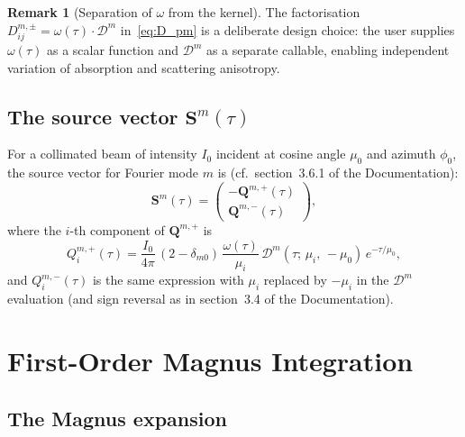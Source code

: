 \documentclass[11pt,a4paper]{article}
\newcommand{\vect}[1]{\bm{#1}}
\theoremstyle{definition}
\newtheorem{remark}{Remark}
\begin{document}
\begin{remark}[Separation of $\omega$ from the kernel]
The factorisation $D^{m,\pm}_{ij}=\omega(\tau)\cdot\mathcal{D}^m$
in~\eqref{eq:D_pm} is a deliberate design choice: the user supplies
$\omega(\tau)$ as a scalar function and $\mathcal{D}^m$ as a separate
callable, enabling independent variation of absorption and scattering
anisotropy.
\end{remark}

\subsection{The source vector \texorpdfstring{$\vect{S}^m(\tau)$}{S\_m(tau)}}

For a collimated beam of intensity $I_0$ incident at cosine angle
$\mu_0$ and azimuth $\phi_0$, the source vector for Fourier mode $m$
is (cf.\ section~3.6.1 of the Documentation):
\begin{equation}\label{eq:source}
  \vect{S}^m(\tau) = \begin{pmatrix} -\vect{Q}^{m,+}(\tau)\\
  \vect{Q}^{m,-}(\tau) \end{pmatrix},
\end{equation}
where the $i$-th component of $\vect{Q}^{m,+}$ is
\begin{equation}\label{eq:Q_plus}
  Q^{m,+}_i(\tau)
  = \frac{I_0}{4\pi}\,(2-\delta_{m0})\,
    \frac{\omega(\tau)}{\mu_i}\,
    \mathcal{D}^m(\tau;\,\mu_i,\,-\mu_0)\,
    e^{-\tau/\mu_0},
\end{equation}
and $Q^{m,-}_i(\tau)$ is the same expression with $\mu_i$ replaced by
$-\mu_i$ in the $\mathcal{D}^m$ evaluation (and sign
reversal as in section~3.4 of the Documentation).


\section{First-Order Magnus Integration}\label{sec:magnus}

\subsection{The Magnus expansion}
\end{document}
